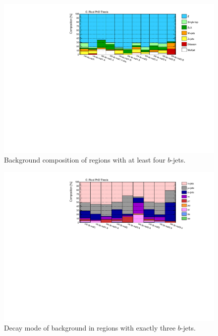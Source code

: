 \begin{figure}[htbp]
\includegraphics[width=\textwidth]{figures/ewk_prod/comp_plots/hh_4b_bkg.pdf}
\caption{Background composition of regions with at least four $b$-jets.}
	\label{fig:bkgcomp_hh4b}
\end{figure}

\begin{figure}[htbp]
\includegraphics[width=\textwidth]{figures/ewk_prod/comp_plots/hh_3b_tt.pdf}
\caption{Decay mode of \ttbar background in regions with exactly three $b$-jets.}
	\label{fig:ttcomp_hh3b}
\end{figure}

